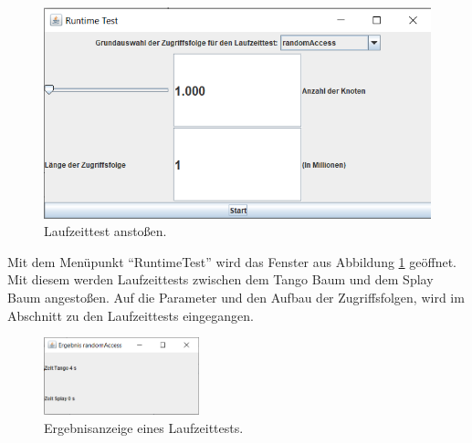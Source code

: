 \documentclass[a4paper,12pt]{article}
\begin{document}
\begin{figure}[H]
	\centering
	\includegraphics[width=1\textwidth]{"Medien/laufzeittest/RuntimeGui"}
	\caption{Laufzeittest anstoßen.}
	\label{fig:RuntimeGui}
\end{figure}

\noindent Mit dem Menüpunkt \enquote{RuntimeTest} wird das Fenster aus Abbildung \ref{fig:RuntimeGui} geöffnet. Mit diesem werden Laufzeittests zwischen dem Tango Baum und dem Splay Baum  angestoßen. Auf die Parameter und den Aufbau der Zugriffsfolgen, wird im Abschnitt zu den Laufzeittests eingegangen.


\begin{figure}[H]
	\centering
	\includegraphics[width=0.4\textwidth]{"Medien/laufzeittest/ResultGUI"}
	\caption{Ergebnisanzeige eines Laufzeittests.}
	\label{fig:ResultGUI}
\end{figure}
\end{document}
